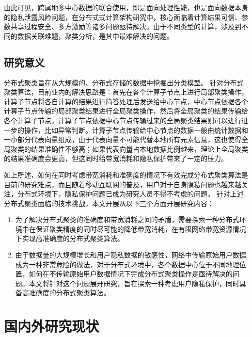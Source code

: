 由此可见，跨属地多中心数据的联合使用，即是面向处理性能，也是面向数据本身的隐私泄露风险问题，在分布式式计算架构研究中，核心面临着计算结果可信、参数共享过程安全、多方激励等诸多问题亟待解决。由于不同类型的计算，涉及到不同的数据关联难题，聚类分析，是其中最难解决的问题。


\subsection{研究意义}
分布式聚类旨在从大规模的、分布式存储的数据中挖掘出分类模型。
针对分布式聚类算法，目前业内的解决思路是：首先在各个计算子节点上进行局部聚类操作，计算子节点将各自计算的结果进行简答处理后发送给中心节点，中心节点依据各个计算子节点传输的局部聚类结果进行全局聚类操作，然后将全局聚类的结果传输给各个计算子节点，计算子节点依据中心节点传输过来的全局聚类结果则可以进行进一步的操作，比如异常判断。计算子节点传输给中心节点的数据一般由统计数据和一小部分代表向量组成，由于代表向量不可能代替本地所有元素信息，这也使得全局聚类的结果准确性不够高；如果代表向量占本地数据比例越来，理论上全局聚类的结果准确度会更高，但这同时给带宽消耗和隐私保护带来了一定的压力。

如上所述，如何在同时考虑带宽消耗和准确度的情况下有效完成分布式聚类算法是目前的研究难点，而且随着移动互联网的普及，用户对于自身隐私问题也越来越关注，分布式环境下，隐私保护问题已成为研究人员不得不考虑的问题。
针对上述分布式聚类面临的技术挑战，本文开展从以下三个方面开展研究内容：
\begin{enumerate}
\item 为了解决分布式聚类的准确度和带宽消耗之间的矛盾，需要探索一种分布式环境中在保证聚类精度的同时尽可能的降低带宽消耗，在有限网络带宽资源情况下实现高准确度的分布式聚类算法。
\item 由于数据量的大规模增长和用户隐私数据的敏感性，网络中传输原始用户数据成为一种非常危险的做法，对于分布式环境中，各个数据中心位于不同地理位置，如何在不传输原始用户数据情况下完成分布式聚类操作是亟待解决的问题。本文将针对这个问题展开研究，旨在探索一种考虑用户隐私保护，同时具备高准确度的分布式聚类算法。
\end{enumerate}


\section{国内外研究现状}


